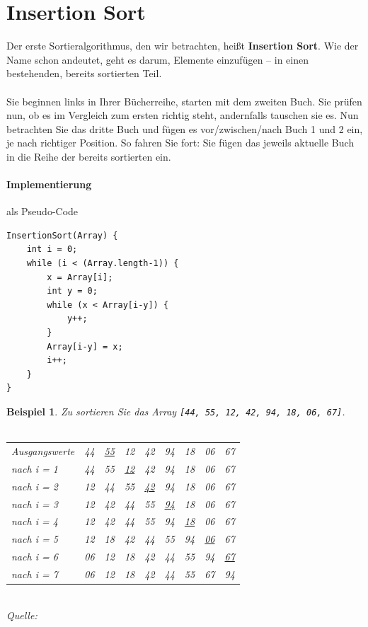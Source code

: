\documentclass[11pt,a4paper]{scrartcl}
\newtheorem{example}{Beispiel}
\begin{document}
\section{Insertion Sort}
Der erste Sortieralgorithmus, den wir betrachten, heißt \textbf{Insertion Sort}. Wie der Name schon andeutet, geht es darum, Elemente einzufügen -- in einen bestehenden, bereits sortierten Teil. \\\\
Sie beginnen links in Ihrer Bücherreihe, starten mit dem zweiten Buch. Sie prüfen nun, ob es im Vergleich zum ersten richtig steht, andernfalls tauschen sie es. Nun betrachten Sie das dritte Buch und fügen es vor/zwischen/nach Buch 1 und 2 ein, je nach richtiger Position. So fahren Sie fort: Sie fügen das jeweils aktuelle Buch in die Reihe der bereits sortierten ein.
\paragraph{Implementierung} als Pseudo-Code
\begin{lstlisting}
InsertionSort(Array) {
	int i = 0;
	while (i < (Array.length-1)) {
		x = Array[i];
		int y = 0;
		while (x < Array[i-y]) {
			y++;		
		} 
		Array[i-y] = x;
		i++;
	}
}
\end{lstlisting}
\begin{example} Zu sortieren Sie das Array \texttt{[44, 55, 12, 42, 94, 18, 06, 67]}. \\\\
\begin{tabular}{|l|l|l|l|l|l|l|l|l|}
\hline
Ausgangswerte & 44 & \uline{55} & 12 & 42 & 94 & 18 & 06 & 67 \\
nach i = 1    & 44 & 55 & \uline{12} & 42 & 94 & 18 & 06 & 67 \\
nach i = 2    & 12 & 44 & 55 & \uline{42} & 94 & 18 & 06 & 67 \\
nach i = 3    & 12 & 42 & 44 & 55 & \uline{94} & 18 & 06 & 67 \\
nach i = 4    & 12 & 42 & 44 & 55 & 94 & \uline{18} & 06 & 67 \\
nach i = 5    & 12 & 18 & 42 & 44 & 55 & 94 & \uline{06} & 67 \\
nach i = 6    & 06 & 12 & 18 & 42 & 44 & 55 & 94 & \uline{67} \\
nach i = 7    & 06 & 12 & 18 & 42 & 44 & 55 & 67 & 94 \\
\hline
\end{tabular} \\
Quelle: \parencite[][S. 493 ff.]{Grundkurs}
\end{example}
\end{document}
